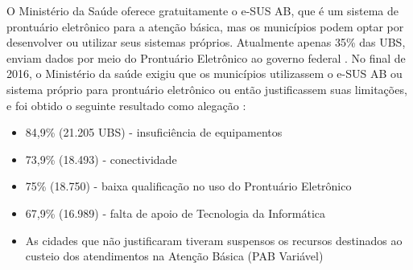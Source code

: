 O Ministério da Saúde oferece gratuitamente o e-SUS AB, que é um sistema de prontuário eletrônico para a atenção básica, mas os municípios podem optar por desenvolver ou utilizar seus sistemas próprios. Atualmente apenas 35\% das UBS, enviam dados por meio do Prontuário Eletrônico ao governo federal \cite{DATASUS}. No final de 2016, o Ministério da saúde exigiu que os municípios utilizassem o e-SUS AB ou sistema próprio para prontuário eletrônico ou então justificassem suas limitações, e foi obtido o seguinte resultado como alegação \cite{DATASUS2016}:
  \begin{itemize}
        	\item 84,9\% (21.205 UBS) - insuficiência de equipamentos
        	\item 73,9\% (18.493) - conectividade
        	\item 75\% (18.750) - baixa qualificação no uso do Prontuário Eletrônico
        	\item 67,9\% (16.989) - falta de apoio de Tecnologia da Informática
        	\item As cidades que não justificaram tiveram suspensos os recursos destinados ao custeio dos atendimentos na Atenção Básica (PAB Variável)
 \end{itemize}
